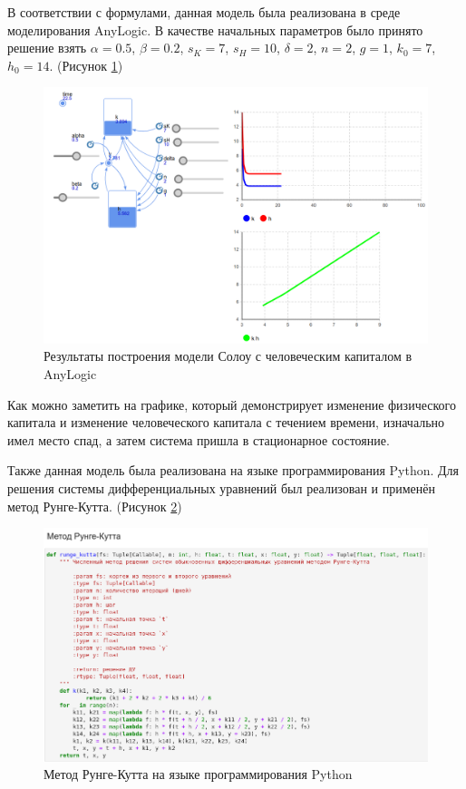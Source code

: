\documentclass[14pt,fleqn]{extarticle}
\begin{document}
	\newpage
	В соответствии с формулами, данная модель была реализована в среде моделирования AnyLogic. В качестве начальных параметров было принято решение взять $\alpha = 0.5$, $\beta = 0.2$, $s_K = 7$, $s_H = 10$, $\delta = 2$, $n = 2$, $g = 1$, $k_0 = 7$, $h_0 = 14$. (Рисунок \ref{fig:M-R-W_anylogic})
	\begin{figure}[h]
		\centering \includegraphics[scale=0.3]{M-R-W_anylogic}
		\caption{Результаты построения модели Солоу с человеческим капиталом в AnyLogic}
		\label{fig:M-R-W_anylogic}
	\end{figure}
	
	Как можно заметить на графике, который демонстрирует изменение физического капитала и изменение человеческого капитала с течением времени, изначально имел место спад, а затем система пришла в стационарное состояние.
	
	\newpage
	Также данная модель была реализована на языке программирования Python. Для решения системы дифференциальных уравнений был реализован и применён метод Рунге-Кутта. (Рисунок \ref{fig:M-R-W_runge_kutta})
	\begin{figure}[h]
		\centering \includegraphics[scale=0.5]{M-R-W_runge_kutta}
		\caption{Метод Рунге-Кутта на языке программирования Python}
		\label{fig:M-R-W_runge_kutta}
	\end{figure}
	
\end{document}
